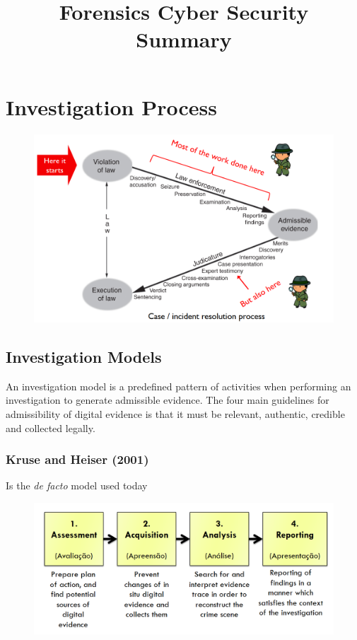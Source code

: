 \documentclass[10pt,a4paper]{report}
\title{\LARGE{Forensics Cyber Security} \\ \vspace{0.5cm} \normalsize{Summary}}
\date{}
\begin{document}
\maketitle
\tableofcontents

\chapter{Investigation Process}
\begin{figure}[H]
\centering
\includegraphics[scale=0.5]{1.png}
\end{figure}
\section{Investigation Models}
An investigation model is a predefined pattern of activities when performing an investigation to generate admissible evidence. The four main guidelines for admissibility of digital evidence is that it must be relevant, authentic, credible and collected legally.
\subsection{Kruse and Heiser (2001)}
Is the \textit{de facto} model used today
\begin{figure}[H]
\centering
\includegraphics[scale=0.4]{2.png}
\end{figure}
\end{document}
